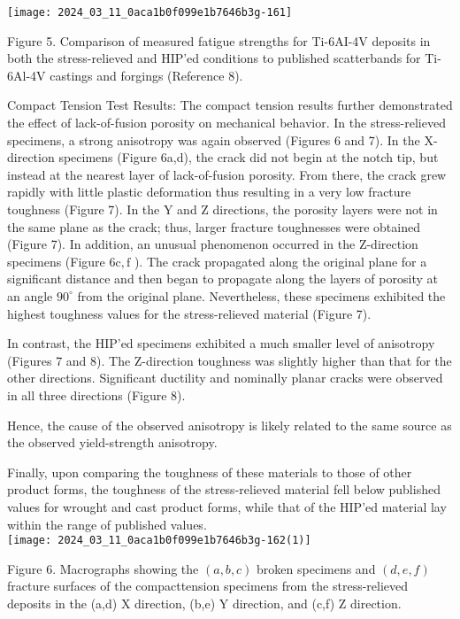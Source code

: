 \documentclass[10pt]{article}
\begin{document}
\begin{center}
\texttt{[image: 2024\_03\_11\_0aca1b0f099e1b7646b3g-161]}
\end{center}

Figure 5. Comparison of measured fatigue strengths for Ti-6AI-4V deposits in both the stress-relieved and HIP'ed conditions to published scatterbands for Ti-6Al-4V castings and forgings (Reference 8).

Compact Tension Test Results: The compact tension results further demonstrated the effect of lack-of-fusion porosity on mechanical behavior. In the stress-relieved specimens, a strong anisotropy was again observed (Figures 6 and 7). In the X-direction specimens (Figure 6a,d), the crack did not begin at the notch tip, but instead at the nearest layer of lack-of-fusion porosity. From there, the crack grew rapidly with little plastic deformation thus resulting in a very low fracture toughness (Figure 7). In the $\mathrm{Y}$ and $\mathrm{Z}$ directions, the porosity layers were not in the same plane as the crack; thus, larger fracture toughnesses were obtained (Figure 7). In addition, an unusual phenomenon occurred in the Z-direction specimens (Figure $6 \mathrm{c}, \mathrm{f}$ ). The crack propagated along the original plane for a significant distance and then began to propagate along the layers of porosity at an angle $90^{\circ}$ from the original plane. Nevertheless, these specimens exhibited the highest toughness values for the stress-relieved material (Figure 7).

In contrast, the HIP'ed specimens exhibited a much smaller level of anisotropy (Figures 7 and 8). The Z-direction toughness was slightly higher than that for the other directions. Significant ductility and nominally planar cracks were observed in all three directions (Figure 8).

Hence, the cause of the observed anisotropy is likely related to the same source as the observed yield-strength anisotropy.

Finally, upon comparing the toughness of these materials to those of other product forms, the toughness of the stress-relieved material fell below published values for wrought and cast product forms, while that of the HIP'ed material lay within the range of published values.\\
\texttt{[image: 2024\_03\_11\_0aca1b0f099e1b7646b3g-162(1)]}

Figure 6. Macrographs showing the $(a, b, c)$ broken specimens and $(d, e, f)$ fracture surfaces of the compacttension specimens from the stress-relieved deposits in the (a,d) $\mathrm{X}$ direction, (b,e) $\mathrm{Y}$ direction, and (c,f) $\mathrm{Z}$ direction.
\end{document}
